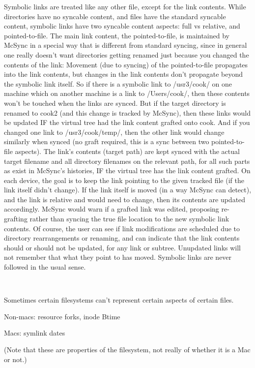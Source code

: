 \documentclass{book}
\begin{document}
Symbolic links are treated like any other file, except for the link contents.  While directories have no syncable content, and files have the standard syncable content, symbolic links have two syncable content aspects: full vs relative, and pointed-to-file.  The main link content, the pointed-to-file, is maintained by McSync in a special way that is different from standard syncing, since in general one really doesn't want directories getting renamed just because you changed the contents of the link:  Movement (due to syncing) of the pointed-to-file propagates into the link contents, but changes in the link contents don't propagate beyond the symbolic link itself.  So if there is a symbolic link to /usr3/cook/ on one machine which on another machine is a link to /Users/cook/, then these contents won't be touched when the links are synced.  But if the target directory is renamed to cook2 (and this change is tracked by McSync), then these links would be updated IF the virtual tree had the link content grafted onto cook.  And if you changed one link to /usr3/cook/temp/, then the other link would change similarly when synced (no graft required, this is a sync between two pointed-to-file aspects).  The link's contents (target path) are kept synced with the actual target filename and all directory filenames on the relevant path, for all such parts as exist in McSync's histories, IF the virtual tree has the link content grafted.  On each device, the goal is to keep the link pointing to the given tracked file (if the link itself didn't change).  If the link itself is moved (in a way McSync can detect), and the link is relative and would need to change, then its contents are updated accordingly.  McSync would warn if a grafted link was edited, proposing re-grafting rather than syncing the true file location to the new symbolic link contents.  Of course, the user can see if link modifications are scheduled due to directory rearrangements or renaming, and can indicate that the link contents should or should not be updated, for any link or subtree.  Unupdated links will not remember that what they point to has moved.  Symbolic links are never followed in the usual sense.

~

Sometimes certain filesystems can't represent certain aspects of certain files.

Non-macs: resource forks, inode Btime

Macs: symlink dates

(Note that these are properties of the filesystem, not really of whether it is a Mac or not.)
\end{document}
